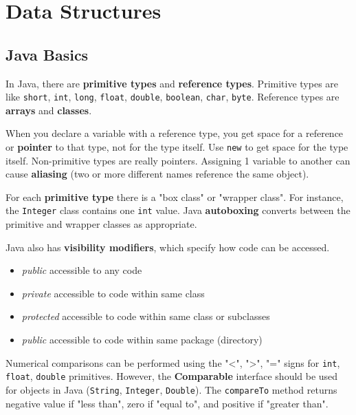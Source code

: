 \section{Data Structures}

\subsection{Java Basics}

In Java, there are \textbf{primitive types} and \textbf{reference types}. Primitive types are like \texttt{short}, \texttt{int}, \texttt{long}, \texttt{float}, \texttt{double}, \texttt{boolean}, \texttt{char}, \texttt{byte}. Reference types are \textbf{arrays} and \textbf{classes}. 

When you declare a variable with a reference type, you get space for a reference or \textbf{pointer} to that type, not for the type itself. Use \texttt{new} to get space for the type itself. Non-primitive types are really pointers. Assigning 1 variable to another can cause \textbf{aliasing} (two or more different names reference the same object). 

For each \textbf{primitive type} there is a "box class" or "wrapper class". For instance, the \texttt{Integer} class contains one \texttt{int} value. Java \textbf{autoboxing} converts between the primitive and wrapper classes as appropriate. 

Java also has \textbf{visibility modifiers}, which specify how code can be accessed.
\begin{itemize}
	\item \textit{public} accessible to any code
	\item \textit{private} accessible to code within same class
	\item \textit{protected} accessible to code within same class or subclasses
	\item \textit{public} accessible to code within same package (directory)
\end{itemize}

Numerical comparisons can be performed using the "<", ">", "=" signs for \texttt{int}, \texttt{float}, \texttt{double} primitives. However, the \textbf{Comparable} interface should be used for objects in Java (\texttt{String}, \texttt{Integer}, \texttt{Double}). The \texttt{compareTo} method returns negative value if "less than", zero if "equal to", and positive if "greater than". 


